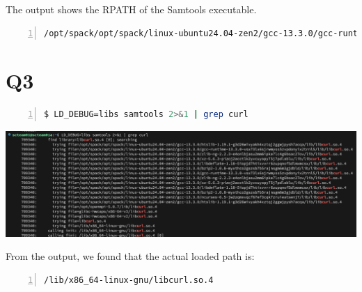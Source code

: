 \documentclass{article}
\begin{document}
The output shows the RPATH of the Samtools executable.
\begin{lstlisting}[language=bash, basicstyle=\ttfamily\small, numbers=left, numberstyle=\tiny\color{gray}, stepnumber=1, frame=single, breaklines=true, breakatwhitespace=false]
/opt/spack/opt/spack/linux-ubuntu24.04-zen2/gcc-13.3.0/gcc-runtime-13.3.0-vsx73lx6sjrwmyss5zvpdonyix2trnl5/lib:/opt/spack/opt/spack/linux-ubuntu24.04-zen2/gcc-13.3.0/zlib-ng-2.2.3-e4onlbjasu2mm6ipke7lc4g6bsac27ov/lib:/opt/spack/opt/spack/linux-ubuntu24.04-zen2/gcc-13.3.0/xz-5.6.3-pizoj2acctlk2yvcuyopy75j7pdlablu/lib:/opt/spack/opt/spack/linux-ubuntu24.04-zen2/gcc-13.3.0/libdeflate-1.18-5iopjd7htixvvrr6zupqnof5dlmxmcsx/lib:/opt/spack/opt/spack/linux-ubuntu24.04-zen2/gcc-13.3.0/bzip2-1.0.8-myxthco2gszsb7b5rajnsgm6m3gjdbld/lib:/opt/spack/opt/spack/linux-ubuntu24.04-zen2/gcc-13.3.0/ncurses-6.5-jw2zqmxvqcf67ef3cqk7zruieatsenj7/lib:/opt/spack/opt/spack/linux-ubuntu24.04-zen2/gcc-13.3.0/htslib-1.19.1-g3d26wivyakh4xztqj2ggwjpysh7acqa/lib
\end{lstlisting}


\section*{Q3}

\begin{lstlisting}[language=bash, basicstyle=\ttfamily\small, numbers=left, numberstyle=\tiny\color{gray}, stepnumber=1, frame=single, breaklines=true, breakatwhitespace=false]
$ LD_DEBUG=libs samtools 2>&1 | grep curl
\end{lstlisting}

\begin{center}
    \includegraphics[width=1\textwidth]{./img/q3.png}
\end{center}

From the output, we found that the actual loaded path is:
\begin{lstlisting}[language=bash, basicstyle=\ttfamily\small, numbers=left, numberstyle=\tiny\color{gray}, stepnumber=1, frame=single, breaklines=true, breakatwhitespace=false]
/lib/x86_64-linux-gnu/libcurl.so.4
\end{lstlisting}
\end{document}
